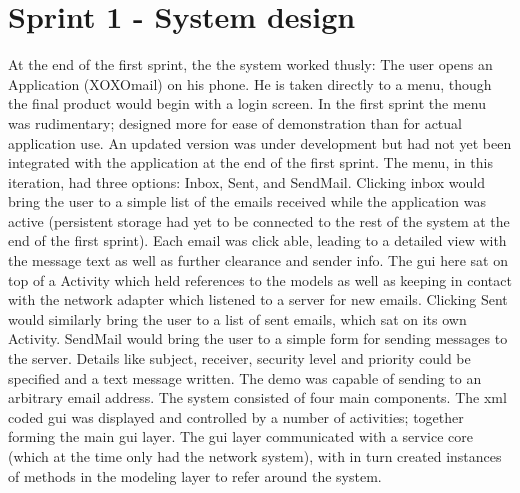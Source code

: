 \section{Sprint 1 - System design}
At the end of the first sprint, the the system worked thusly: The user opens an Application (XOXOmail) on his phone. He is taken directly to a menu, though the final product would begin with a login screen. In the first sprint the menu was rudimentary; designed more for ease of demonstration than for actual application use. An updated version was under development but had not yet been integrated with the application at the end of the first sprint. The menu, in this iteration, had three options: Inbox, Sent, and SendMail.
\newline
\newline
Clicking inbox would bring the user to a simple list of the emails received while the application was active (persistent storage had yet to be connected to the rest of the system at the end of the first sprint). Each email was click able, leading to a detailed view with the message text as well as further clearance and sender info. The \gls{gui} here sat on top of a Activity which held references to the models as well as keeping in contact with the network adapter which listened to a server for new emails. Clicking Sent would similarly bring the user to a list of sent emails, which sat on its own Activity.
\newline
\newline
SendMail would bring the user to a simple form for sending messages to the server. Details like subject, receiver, security level and priority could be specified and a text message written. The demo was capable of sending to an arbitrary email address.
\newline
\newline
The system consisted of four main components. The \gls{xml} coded \gls{gui} was displayed and controlled by a number of activities; together forming the main \gls{gui} layer. The \gls{gui} layer communicated with a service core (which at the time only had the network system), with in turn created instances of methods in the modeling layer to refer around the system.
